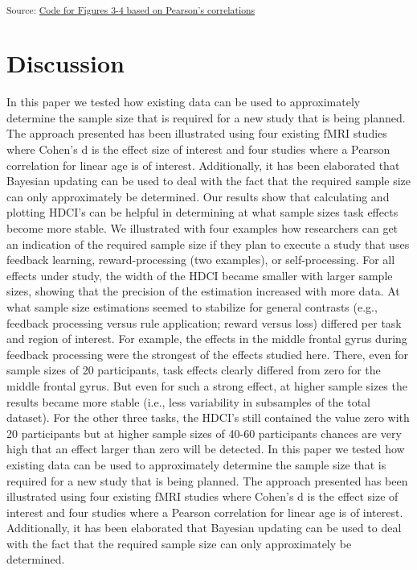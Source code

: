\documentclass[
  letterpaper,
  DIV=11,
  numbers=noendperiod]{scrartcl}
\begin{document}
\textsubscript{Source:
\href{https://eduardklap.github.io/sample-size-fmri/notebooks/figures-correlations-preview.html\#cell-fig-4}{Code
for Figures 3-4 based on Pearson's correlations}}

\section{Discussion}\label{discussion}

In this paper we tested how existing data can be used to approximately
determine the sample size that is required for a new study that is being
planned. The approach presented has been illustrated using four existing
fMRI studies where Cohen's d is the effect size of interest and four
studies where a Pearson correlation for linear age is of interest.
Additionally, it has been elaborated that Bayesian updating can be used
to deal with the fact that the required sample size can only
approximately be determined. Our results show that calculating and
plotting HDCI's can be helpful in determining at what sample sizes task
effects become more stable. We illustrated with four examples how
researchers can get an indication of the required sample size if they
plan to execute a study that uses feedback learning, reward-processing
(two examples), or self-processing. For all effects under study, the
width of the HDCI became smaller with larger sample sizes, showing that
the precision of the estimation increased with more data. At what sample
size estimations seemed to stabilize for general contrasts (e.g.,
feedback processing versus rule application; reward versus loss)
differed per task and region of interest. For example, the effects in
the middle frontal gyrus during feedback processing were the strongest
of the effects studied here. There, even for sample sizes of 20
participants, task effects clearly differed from zero for the middle
frontal gyrus. But even for such a strong effect, at higher sample sizes
the results became more stable (i.e., less variability in subsamples of
the total dataset). For the other three tasks, the HDCI's still
contained the value zero with 20 participants but at higher sample sizes
of 40-60 participants chances are very high that an effect larger than
zero will be detected. In this paper we tested how existing data can be
used to approximately determine the sample size that is required for a
new study that is being planned. The approach presented has been
illustrated using four existing fMRI studies where Cohen's d is the
effect size of interest and four studies where a Pearson correlation for
linear age is of interest. Additionally, it has been elaborated that
Bayesian updating can be used to deal with the fact that the required
sample size can only approximately be determined.
\end{document}
